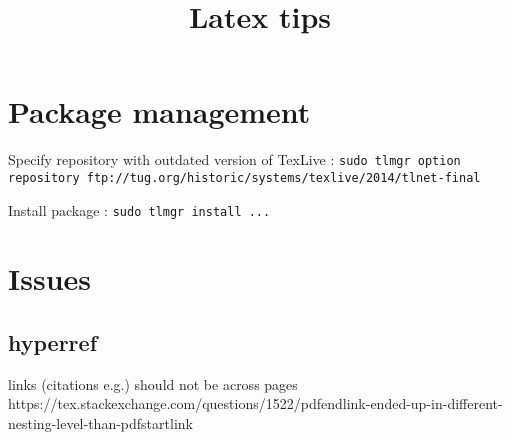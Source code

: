 


\title{Latex tips}



\date{}


\maketitle

\justify

\renewcommand{\abstractname}{}

\begin{abstract}

\end{abstract}




\section*{Package management}

Specify repository with outdated version of TexLive : \texttt{sudo tlmgr option repository ftp://tug.org/historic/systems/texlive/2014/tlnet-final}

Install package : \texttt{sudo tlmgr install ...}



\section*{Issues}

\subsection*{hyperref}

links (citations e.g.) should not be across pages https://tex.stackexchange.com/questions/1522/pdfendlink-ended-up-in-different-nesting-level-than-pdfstartlink
















